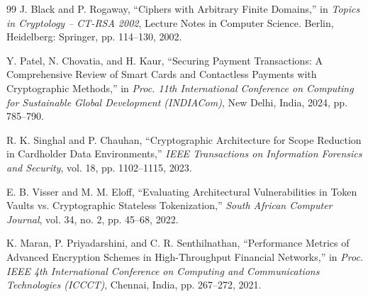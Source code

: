 \documentclass[conference]{IEEEtran}
\begin{document}
\begin{thebibliography}{99}
 J. Black and P. Rogaway, ``Ciphers with Arbitrary Finite Domains,'' in \textit{Topics in Cryptology -- CT-RSA 2002}, Lecture Notes in Computer Science. Berlin, Heidelberg: Springer, pp. 114--130, 2002.

 Y. Patel, N. Chovatia, and H. Kaur, ``Securing Payment Transactions: A Comprehensive Review of Smart Cards and Contactless Payments with Cryptographic Methods,'' in \textit{Proc. 11th International Conference on Computing for Sustainable Global Development (INDIACom)}, New Delhi, India, 2024, pp. 785--790.

 R. K. Singhal and P. Chauhan, ``Cryptographic Architecture for Scope Reduction in Cardholder Data Environments,'' \textit{IEEE Transactions on Information Forensics and Security}, vol. 18, pp. 1102--1115, 2023.

 E. B. Visser and M. M. Eloff, ``Evaluating Architectural Vulnerabilities in Token Vaults vs. Cryptographic Stateless Tokenization,'' \textit{South African Computer Journal}, vol. 34, no. 2, pp. 45--68, 2022.

 K. Maran, P. Priyadarshini, and C. R. Senthilnathan, ``Performance Metrics of Advanced Encryption Schemes in High-Throughput Financial Networks,'' in \textit{Proc. IEEE 4th International Conference on Computing and Communications Technologies (ICCCT)}, Chennai, India, pp. 267--272, 2021.

\end{thebibliography}
\end{document}
